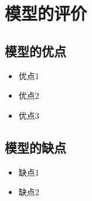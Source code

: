 \documentclass[withoutpreface,bwprint]{cumcmthesis}
\begin{document}







\section{模型的评价}

\subsection{模型的优点}
\begin{itemize}[itemindent=2em]
\item 优点1
\item 优点2
\item 优点3
\end{itemize}

\subsection{模型的缺点}
\begin{itemize}[itemindent=2em]
\item 缺点1
\item 缺点2
\end{itemize}

\nocite{*}
\end{document}
